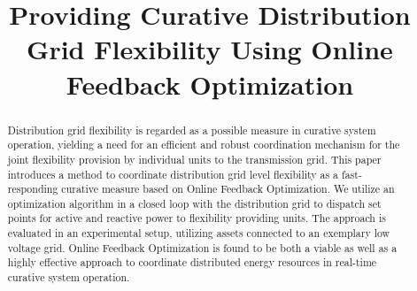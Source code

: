 \documentclass[conference,a4paper]{IEEEtran}
\begin{document}
\title{Providing Curative Distribution Grid Flexibility Using Online Feedback Optimization}

\author{
    }

\IEEEoverridecommandlockouts
{}

\maketitle

\IEEEpubidadjcol

\begin{abstract}
Distribution grid flexibility is regarded as a possible measure in curative system operation, yielding a need for an efficient and robust coordination mechanism for the joint flexibility provision by individual units to the transmission grid. This paper introduces a method to coordinate distribution grid level flexibility as a fast-responding curative measure based on Online Feedback Optimization. We utilize an optimization algorithm in a closed loop with the distribution grid to dispatch set points for active and reactive power to flexibility providing units. The approach is evaluated in an experimental setup, utilizing assets connected to an exemplary low voltage grid. Online Feedback Optimization is found to be both a viable as well as a highly effective approach to coordinate distributed energy resources in real-time curative system operation.
\end{abstract}
\end{document}
